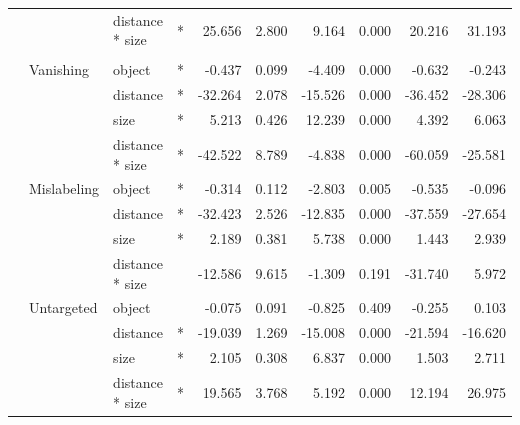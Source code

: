 \begin{longtable}[t]{llllrrrrrr}
\cmidrule{3-10}\nopagebreak
\hspace{1em} &  & distance * size & * & 25.656 & 2.800 & 9.164 & 0.000 & 20.216 & 31.193\\
\cmidrule{1-10}\pagebreak[0]
\addlinespace[0.3em]
\multicolumn{10}{l}{\textbf{Cascade R-CNN}}\\
\hspace{1em} & Vanishing & object & * & -0.437 & 0.099 & -4.409 & 0.000 & -0.632 & -0.243\\
\cmidrule{3-10}\nopagebreak
\hspace{1em} &  & distance & * & -32.264 & 2.078 & -15.526 & 0.000 & -36.452 & -28.306\\
\cmidrule{3-10}\nopagebreak
\hspace{1em} &  & size & * & 5.213 & 0.426 & 12.239 & 0.000 & 4.392 & 6.063\\
\cmidrule{3-10}\nopagebreak
\hspace{1em} &  & distance * size & * & -42.522 & 8.789 & -4.838 & 0.000 & -60.059 & -25.581\\
\cmidrule{2-10}\nopagebreak
\hspace{1em} & Mislabeling & object & * & -0.314 & 0.112 & -2.803 & 0.005 & -0.535 & -0.096\\
\cmidrule{3-10}\nopagebreak
\hspace{1em} &  & distance & * & -32.423 & 2.526 & -12.835 & 0.000 & -37.559 & -27.654\\
\cmidrule{3-10}\nopagebreak
\hspace{1em} &  & size & * & 2.189 & 0.381 & 5.738 & 0.000 & 1.443 & 2.939\\
\cmidrule{3-10}\nopagebreak
\hspace{1em} &  & distance * size &  & -12.586 & 9.615 & -1.309 & 0.191 & -31.740 & 5.972\\
\cmidrule{2-10}\nopagebreak
\hspace{1em} & Untargeted & object &  & -0.075 & 0.091 & -0.825 & 0.409 & -0.255 & 0.103\\
\cmidrule{3-10}\nopagebreak
\hspace{1em} &  & distance & * & -19.039 & 1.269 & -15.008 & 0.000 & -21.594 & -16.620\\
\cmidrule{3-10}\nopagebreak
\hspace{1em} &  & size & * & 2.105 & 0.308 & 6.837 & 0.000 & 1.503 & 2.711\\
\cmidrule{3-10}\nopagebreak
\hspace{1em} &  & distance * size & * & 19.565 & 3.768 & 5.192 & 0.000 & 12.194 & 26.975\\
\bottomrule
\end{longtable}
\endgroup{}
